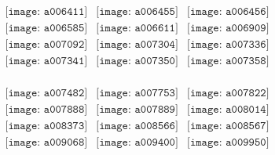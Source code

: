 \documentclass{article}
\begin{document}
        \clearpage
        \begin{figure}[H]
 \begin{center}$
 \begin{array}{cccc}
\texttt{[image: a006411]}&\texttt{[image: a006455]}&\texttt{[image: a006456]}\\\texttt{[image: a006585]}&\texttt{[image: a006611]}&\texttt{[image: a006909]}\\\texttt{[image: a007092]}&\texttt{[image: a007304]}&\texttt{[image: a007336]}\\\texttt{[image: a007341]}&\texttt{[image: a007350]}&\texttt{[image: a007358]}\\
\end{array}$
\end{center}
\end{figure}

\begin{figure}[H]
 \begin{center}$
 \begin{array}{cccc}
\texttt{[image: a007482]}&\texttt{[image: a007753]}&\texttt{[image: a007822]}\\\texttt{[image: a007888]}&\texttt{[image: a007889]}&\texttt{[image: a008014]}\\\texttt{[image: a008373]}&\texttt{[image: a008566]}&\texttt{[image: a008567]}\\\texttt{[image: a009068]}&\texttt{[image: a009400]}&\texttt{[image: a009950]}\\
\end{array}$
\end{center}
\end{figure}
\end{document}
